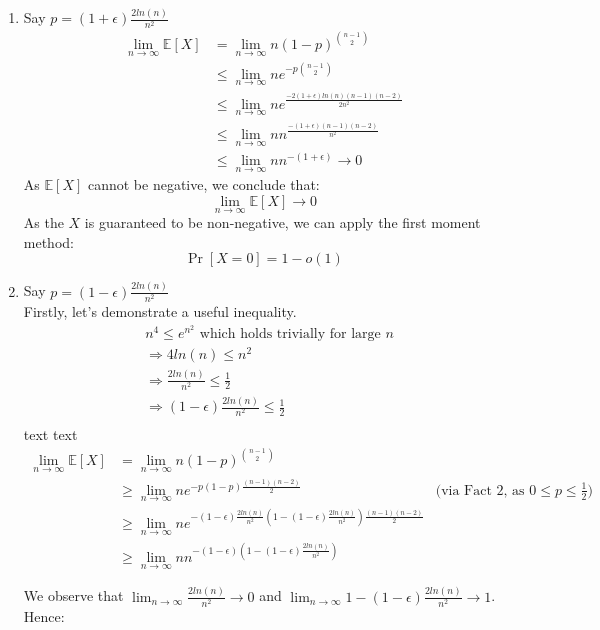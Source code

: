 \documentclass[a4paper,german]{article}
\begin{document}
\begin{enumerate}

\item Say \(p = (1+\epsilon)\frac{2ln(n)}{n^2} \)
\begin{align*}
\lim_{n \to \infty} \mathbb{E}[X] &= \lim_{n \to \infty} n (1-p)^ {{n-1} \choose {2}} \\
&\leq \lim_{n \to \infty} n e^{-p{{n-1} \choose {2}}} \\
&\leq \lim_{n \to \infty} n e^{\frac{-2(1+ \epsilon) ln(n)(n-1)(n-2)}{2n^2}} \\
&\leq \lim_{n \to \infty} n n^{\frac{-(1+ \epsilon) (n-1)(n-2)}{n^2}} \\
&\leq \lim_{n \to \infty} n n^{-(1+ \epsilon)} \to 0
\end{align*}
As \(\mathbb{E}[X]\) cannot be negative, we conclude that:
$$ \lim_{n \to \infty} \mathbb{E}[X] \to 0$$
As the \(X\) is guaranteed to be non-negative, we can apply the first moment method:
$$ \Pr[X = 0] = 1 - o(1)$$

\item Say \(p = (1- \epsilon)\frac{2ln(n)}{n^2} \) \\

Firstly, let's demonstrate a useful inequality.
\begin{align*}
& n^4 \leq e^{n^2} \text{ which holds trivially for large \(n\)} \\
&\Rightarrow 4ln(n) \leq n^2\\
& \Rightarrow \frac{2ln(n)}{n^2} \leq \frac{1}{2}\\
& \Rightarrow (1-\epsilon) \frac{2ln(n)}{n^2} \leq \frac{1}{2}\\
\end{align*}
text text
\begin{align*}
\lim_{n \to \infty} \mathbb{E}[X] &= \lim_{n \to \infty} n (1-p)^ {{n-1} \choose {2}} \\
&\geq \lim_{n \to \infty} n e^{-p(1 - p) \frac{(n-1)(n-2)}{2}}   & \text{(via Fact 2, as } 0 \leq p \leq \frac{1}{2} \text{)}\\
&\geq  \lim_{n \to \infty} n e^{ - (1 - \epsilon) \frac{2 ln(n)}{n^2} (1-(1-\epsilon)\frac{2ln(n)}{n^2}) \frac{(n-1)(n-2)}{2}}\\
&\geq \lim_{n \to \infty} n n^{- (1-\epsilon) (1 - (1- \epsilon)\frac{2ln(n)}{n^2})} 
\end{align*}

We observe that 
\( \lim_{n \to \infty} \frac{2ln(n)}{n^2} \to 0 \) and \( \lim_{n \to \infty} 1 - (1-\epsilon)\frac{2ln(n)}{n^2} \to 1 \).
Hence:


\end{enumerate}
\end{document}
